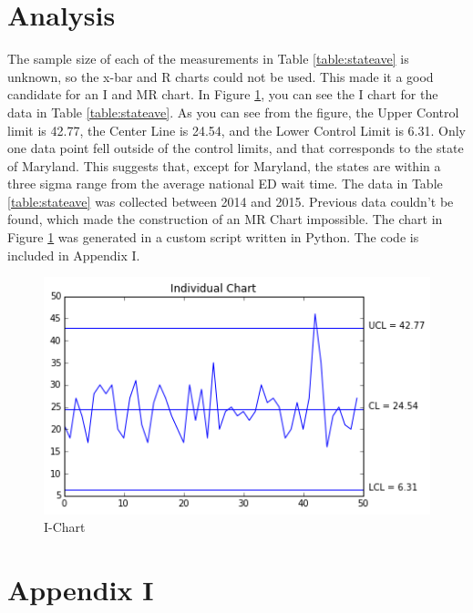\documentclass{article}
\begin{document}
\section*{Analysis}
The sample size of each of the measurements in Table \ref{table:stateave} is unknown, so the x-bar and R charts could not be used.  This made it a good candidate for an I and MR chart.  In Figure \ref{fig:ichart}, you can see the I chart for the data in Table \ref{table:stateave}.  As you can see from the figure, the Upper Control limit is 42.77, the Center Line is 24.54, and the Lower Control Limit is 6.31.  Only one data point fell outside of the control limits, and that corresponds to the state of Maryland.  This suggests that, except for Maryland, the states are within a three sigma range from the average national ED wait time.  The data in Table \ref{table:stateave} was collected between 2014 and 2015.  Previous data couldn't be found, which made the construction of an MR Chart impossible.  The chart in Figure \ref{fig:ichart} was generated in a custom script written in Python.  The code is included in Appendix I.
\begin{figure}
	\caption{I-Chart}
	\label{fig:ichart}
	\includegraphics[width = \textwidth]{IChart}
\end{figure}

\pagebreak
\section*{Appendix I}

\end{document}
